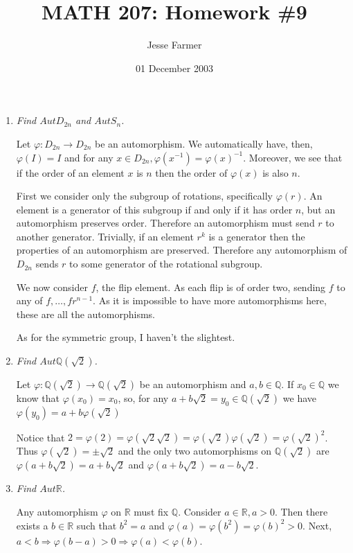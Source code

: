 \documentclass[12pt]{article}
\title{MATH 207: Homework \#9}
\author{Jesse Farmer}
\date{01 December 2003}
\begin{document}
\maketitle
\begin{enumerate}
\item \emph{Find $Aut D_{2n}$ and $Aut S_n$.}

Let $\varphi: D_{2n} \rightarrow D_{2n}$ be an automorphism.  We automatically have, then, $\varphi(I)=I$ and for any $x \in D_{2n},\varphi(x^{-1})=\varphi(x)^{-1}$.  Moreover, we see that if the order of an element $x$ is $n$ then the order of $\varphi(x)$ is also $n$.

First we consider only the subgroup of rotations, specifically $\varphi(r)$.  An element is a generator of this subgroup if and only if it has order $n$, but an automorphism preserves order.  Therefore an automorphism must send $r$ to another generator.  Trivially, if an element $r^k$ is a generator then the properties of an automorphism are preserved.  Therefore any automorphism of $D_{2n}$ sends $r$ to some generator of the rotational subgroup.

We now consider $f$, the flip element.  As each flip is of order two, sending $f$ to any of $f,\ldots,fr^{n-1}$.  As it is impossible to have more automorphisms here, these are all the automorphisms.

As for the symmetric group, I haven't the slightest.

\item \emph{Find $Aut{\mathbb{Q}(\sqrt{2})}$.}

Let $\varphi: \mathbb{Q}(\sqrt{2}) \rightarrow \mathbb{Q}(\sqrt{2})$ be an automorphism and $a,b \in \mathbb{Q}$.  If $x_0 \in \mathbb{Q}$ we know that $\varphi(x_0) = x_0$, so, for any $a + b\sqrt{2} = y_0 \in \mathbb{Q}(\sqrt{2})$ we have $\varphi(y_0) = a + b\varphi(\sqrt{2})$

Notice that $2 = \varphi(2) = \varphi(\sqrt{2}\sqrt{2}) = \varphi(\sqrt{2})\varphi(\sqrt{2}) = \varphi(\sqrt{2})^2$.  Thus $\varphi(\sqrt{2}) = \pm \sqrt{2}$ and the only two automorphisms on $\mathbb{Q}(\sqrt{2})$ are $\varphi(a+b\sqrt{2}) = a+b\sqrt{2}$ and $\varphi(a+b\sqrt{2}) = a-b\sqrt{2}$.
\item \emph{Find $Aut{\mathbb{R}}$.}

Any automorphism $\varphi$ on $\mathbb{R}$ must fix $\mathbb{Q}$.  Consider $a \in \mathbb{R}, a > 0$.  Then there exists a $b \in \mathbb{R}$ such that $b^2 = a$ and $\varphi(a) = \varphi(b^2) = \varphi(b)^2 > 0$.  Next, $a<b \Rightarrow \varphi(b-a)>0 \Rightarrow \varphi(a)<\varphi(b)$.


\end{enumerate}
\end{document}
